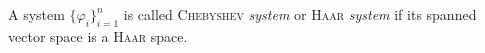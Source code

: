 \begin{definition}
A system $\{\varphi_i\}^n_{i=1}$ is called \textsc{Chebyshev} \emph{system} or \textsc{Haar} \emph{system} if its spanned vector space is a \textsc{Haar} space.
\end{definition}